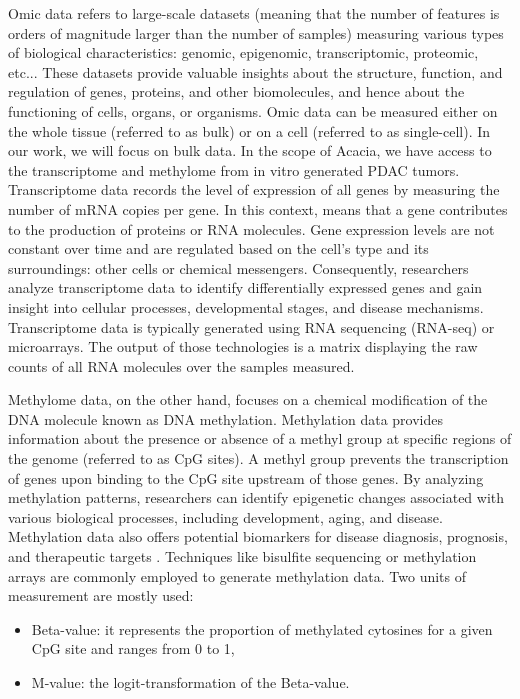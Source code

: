 \documentclass{article}
\begin{document}
Omic data refers to large-scale datasets (meaning that the number of features is orders of magnitude larger than the number of samples) measuring various types of biological characteristics: genomic, epigenomic, transcriptomic, proteomic, etc...
These datasets provide valuable insights about the structure, function, and regulation of genes, proteins, and other biomolecules, and hence about the functioning of cells, organs, or organisms.
Omic data can be measured either on the whole tissue (referred to as bulk) or on a cell (referred to as single-cell). In our work, we will focus on bulk data.
In the scope of Acacia, we have access to the transcriptome and methylome from in vitro generated PDAC tumors. \\

Transcriptome data records the level of expression of all genes by measuring the number of mRNA copies per gene.
In this context,  means that a gene contributes to the production of proteins or RNA molecules.
Gene expression levels are not constant over time and are regulated based on the cell's type and its surroundings: other cells or chemical messengers.
Consequently, researchers analyze transcriptome data to identify differentially expressed genes and gain insight into cellular processes, developmental stages, and disease mechanisms. 
Transcriptome data is typically generated using RNA sequencing (RNA-seq) or microarrays. 
The output of those technologies is a matrix displaying the raw counts of all RNA molecules over the samples measured.

Methylome data, on the other hand, focuses on a chemical modification of the DNA molecule known as DNA methylation. 
Methylation data provides information about the presence or absence of a methyl group at specific regions of the genome (referred to as CpG sites). 
A methyl group prevents the transcription of genes upon binding to the CpG site upstream of those genes.
By analyzing methylation patterns, researchers can identify epigenetic changes associated with various biological processes, including development, aging, and disease. 
Methylation data also offers potential biomarkers for disease diagnosis, prognosis, and therapeutic targets \cite{teodoridis_2004_epigenetic}.
Techniques like bisulfite sequencing or methylation arrays are commonly employed to generate methylation data. 
Two units of measurement are mostly used:
\begin{itemize}
    \item Beta-value: it represents the proportion of methylated cytosines for a given CpG site and ranges from 0 to 1,
    \item M-value: the logit-transformation of the Beta-value.
\end{itemize}
\end{document}
